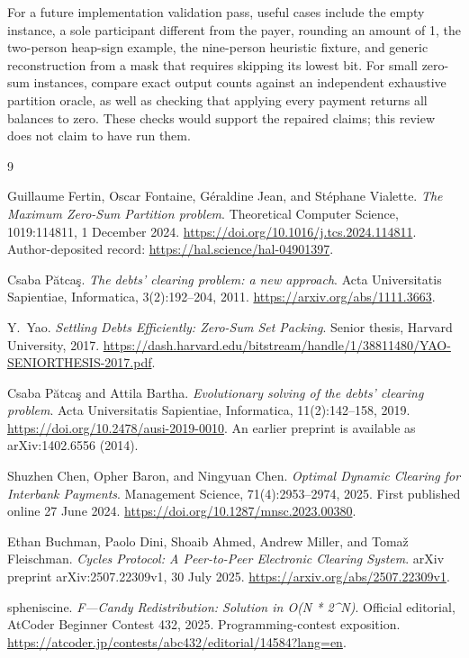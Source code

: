\documentclass[11pt]{article}
\begin{document}
For a future implementation validation pass, useful cases include the empty
instance, a sole participant different from the payer, rounding an amount of 1,
the two-person heap-sign example, the nine-person heuristic fixture, and
generic reconstruction from a mask that requires skipping its lowest bit.
For small zero-sum instances, compare exact output counts against an
independent exhaustive partition oracle, as well as checking that applying
every payment returns all balances to zero. These checks would support
the repaired claims; this review does not claim to have run them.

\begin{thebibliography}{9}

Guillaume Fertin, Oscar Fontaine, G\'{e}raldine Jean, and St\'{e}phane Vialette.
\emph{The Maximum Zero-Sum Partition problem}.
Theoretical Computer Science, 1019:114811, 1 December 2024.
\url{https://doi.org/10.1016/j.tcs.2024.114811}.
Author-deposited record: \url{https://hal.science/hal-04901397}.

Csaba P\u{a}tca\c{s}.
\emph{The debts' clearing problem: a new approach}.
Acta Universitatis Sapientiae, Informatica, 3(2):192--204, 2011.
\url{https://arxiv.org/abs/1111.3663}.

Y.~Yao.
\emph{Settling Debts Efficiently: Zero-Sum Set Packing}.
Senior thesis, Harvard University, 2017.
\url{https://dash.harvard.edu/bitstream/handle/1/38811480/YAO-SENIORTHESIS-2017.pdf}.

Csaba P\u{a}tca\c{s} and Attila Bartha.
\emph{Evolutionary solving of the debts' clearing problem}.
Acta Universitatis Sapientiae, Informatica, 11(2):142--158, 2019.
\url{https://doi.org/10.2478/ausi-2019-0010}.
An earlier preprint is available as arXiv:1402.6556 (2014).

Shuzhen Chen, Opher Baron, and Ningyuan Chen.
\emph{Optimal Dynamic Clearing for Interbank Payments}.
Management Science, 71(4):2953--2974, 2025.
First published online 27 June 2024.
\url{https://doi.org/10.1287/mnsc.2023.00380}.

Ethan Buchman, Paolo Dini, Shoaib Ahmed, Andrew Miller, and
Toma\v{z} Fleischman.
\emph{Cycles Protocol: A Peer-to-Peer Electronic Clearing System}.
arXiv preprint arXiv:2507.22309v1, 30 July 2025.
\url{https://arxiv.org/abs/2507.22309v1}.

spheniscine.
\emph{F---Candy Redistribution: Solution in O(N * 2\^{}N)}.
Official editorial, AtCoder Beginner Contest 432, 2025.
Programming-contest exposition.
\url{https://atcoder.jp/contests/abc432/editorial/14584?lang=en}.

\end{thebibliography}
\end{document}
